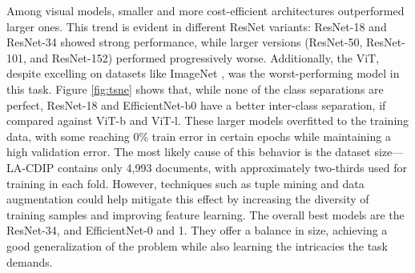 Among visual models, smaller and more cost-efficient architectures outperformed larger ones. This trend is evident in different ResNet variants: ResNet-18 and ResNet-34 showed strong performance, while larger versions (ResNet-50, ResNet-101, and ResNet-152) performed progressively worse. Additionally, the \gls{ViT}, despite excelling on datasets like ImageNet \cite{imagenet}, was the worst-performing model in this task. Figure \ref{fig:tsne} shows that, while none of the class separations are perfect, ResNet-18 and EfficientNet-b0 have a better inter-class separation, if compared against ViT-b and ViT-l. These larger models overfitted to the training data, with some reaching 0\% train error in certain epochs while maintaining a high validation error. The most likely cause of this behavior is the dataset size—LA-CDIP contains only 4,993 documents, with approximately two-thirds used for training in each fold. However, techniques such as tuple mining and data augmentation could help mitigate this effect by increasing the diversity of training samples and improving feature learning. The overall best models are the ResNet-34, and EfficientNet-0 and 1. They offer a balance in size, achieving a good generalization of the problem while also learning the intricacies the task demands.

